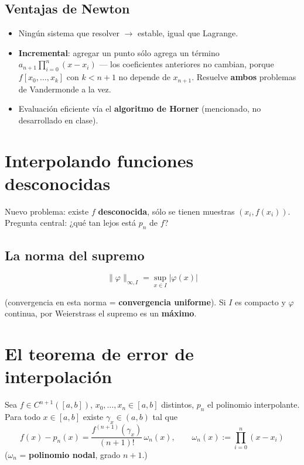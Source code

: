 \documentclass[12pt,a4paper]{article}
\begin{document}
\subsection{Ventajas de Newton}

\begin{itemize}
  \item Ningún sistema que resolver $\to$ estable, igual que Lagrange.
  \item \textbf{Incremental}: agregar un punto sólo agrega un término
  $a_{n+1}\prod_{i=0}^{n}(x-x_i)$ — los coeficientes anteriores no
  cambian, porque $f[x_0,\dots,x_k]$ con $k<n+1$ no depende de $x_{n+1}$.
  Resuelve \textbf{ambos} problemas de Vandermonde a la vez.
  \item Evaluación eficiente vía el \textbf{algoritmo de Horner}
  (mencionado, no desarrollado en clase).
\end{itemize}

\section{Interpolando funciones desconocidas}

Nuevo problema: existe $f$ \textbf{desconocida}, sólo se tienen muestras
$(x_i,f(x_i))$. Pregunta central: ¿qué tan lejos está $p_n$ de $f$?

\subsection{La norma del supremo}

$$\|\varphi\|_{\infty,I} = \sup_{x\in I} |\varphi(x)|$$

(convergencia en esta norma = \textbf{convergencia uniforme}). Si $I$ es
compacto y $\varphi$ continua, por Weierstrass el supremo es un
\textbf{máximo}.

\section{El teorema de error de interpolación}

\begin{keybox}[Teorema]
Sea $f\in C^{n+1}([a,b])$, $x_0,\dots,x_n\in[a,b]$ distintos, $p_n$ el
polinomio interpolante. Para todo $x\in[a,b]$ existe $\gamma_x\in(a,b)$ tal
que
$$f(x) - p_n(x) = \frac{f^{(n+1)}(\gamma_x)}{(n+1)!}\,\omega_n(x), \qquad \omega_n(x) := \prod_{i=0}^{n}(x-x_i)$$
($\omega_n$ = \textbf{polinomio nodal}, grado $n+1$.)
\end{keybox}
\end{document}
